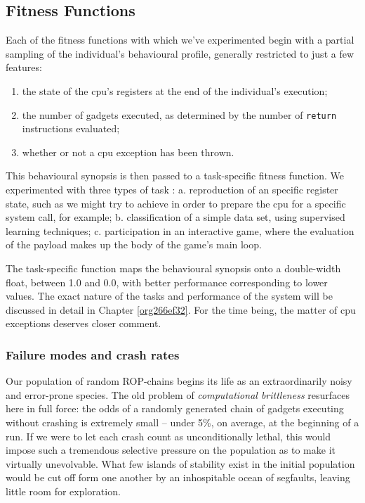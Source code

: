 \documentclass[12pt,glossary]{dalthesis}
\begin{document}
\subsection{Fitness Functions}
\label{sec:orgf856890}
\label{org68aa347}

Each of the fitness functions with which we've experimented begin with a partial
sampling of the individual's behavioural profile, generally restricted to just
a few features:
\begin{enumerate}
\item the state of the \gls{cpu}'s registers at the end of the individual's execution;
\item the number of gadgets executed, as determined by the number of \texttt{return}
instructions evaluated;
\item whether or not a \gls{cpu} exception has been thrown.
\end{enumerate}

This behavioural synopsis is then passed to a task-specific fitness function. We
experimented with three types of task : 
  a. reproduction of an specific register state, such as we might try to achieve
     in order to prepare the \gls{cpu} for a specific system call, for example;
  b. classification of a simple data set, using supervised learning techniques;
  c. participation in an interactive game, where the evaluation of the payload
     makes up the body of the game's main loop.

The task-specific function maps the behavioural synopsis onto a double-width float,
between 1.0 and 0.0, with better performance corresponding to lower values. 
The exact nature of the tasks and performance of the system will be discussed in
detail in Chapter \ref{org266ef32}. For the time being, the matter of \gls{cpu}
exceptions deserves closer comment.

\subsubsection{Failure modes and crash rates}
\label{sec:org27b815b}

Our population of random ROP-chains begins its life as an extraordinarily noisy
and error-prone species. The old problem of \emph{computational brittleness}  resurfaces here in full force: the odds of a
randomly generated chain of gadgets executing without crashing is extremely
small  -- under 5\%, on average, at the
beginning of a run.  If we were to let each crash count as unconditionally
lethal, this would impose such a tremendous selective pressure on the population
as to make it virtually unevolvable. What few islands of stability exist in the
initial population would be cut off form one another by an inhospitable ocean of
segfaults, leaving little room for exploration.
\end{document}
